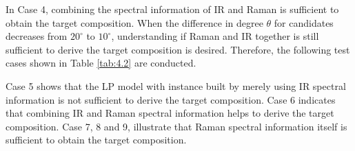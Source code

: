 In Case 4, combining the spectral information of IR and Raman is sufficient to obtain the target composition. When the difference in degree $\theta$ for candidates decreases from $20^{\circ}$ to $10^{\circ}$, understanding if Raman and IR together is still sufficient to derive the target composition is desired. Therefore, the following test cases shown in Table \ref{tab:4.2} are conducted. \\

\begin{table} \tiny 
{}
\caption{Test case 5 to 9 for Met candidates.}
\label{tab:4.2}
\end{table}	

Case 5 shows that the LP model with instance built by merely using IR spectral information is not sufficient to derive the target composition. Case 6 indicates that combining IR and Raman spectral information helps to derive the target composition. Case 7, 8 and 9, illustrate that Raman spectral information itself is sufficient to obtain the target composition. \\

